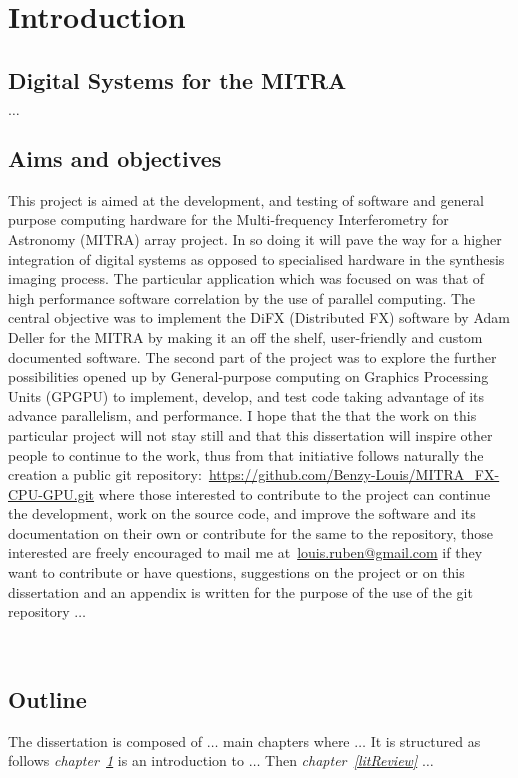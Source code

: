 
\chapter{Introduction} %

\label{Chapter1} %



\section{Digital Systems for the MITRA}
\label{sec:aboutDigiMITRA}
$\ldots$
\section{Aims and objectives}
\label{sec:aboutAimObjectives}
This project is aimed at the development, and testing of software and general purpose computing hardware for the Multi-frequency Interferometry for Astronomy (MITRA) array project. In so doing it will pave the way for a higher integration of digital systems as opposed to specialised hardware in the synthesis imaging process. The particular application which was focused on was that of high performance software correlation by the use of parallel computing. The central objective was to implement the DiFX (Distributed FX) software by Adam Deller for the MITRA by making it an off the shelf, user-friendly and custom documented software. The second part of the project was to explore the further possibilities opened up by General-purpose computing on Graphics Processing Units (GPGPU) to implement, develop, and test code taking advantage of its advance parallelism, and performance. I hope that the that the work on this particular project will not stay still and that this dissertation will inspire other people to continue to the work, thus from that initiative follows naturally the creation a public git repository:~\url{https://github.com/Benzy-Louis/MITRA_FX-CPU-GPU.git} where those interested to contribute to the project can continue the development, work on the source code, and improve the software and its documentation on their own or contribute for the same to the repository, those interested are freely encouraged to mail me at~\href{mailto:louis.ruben@gmail.com}{louis.ruben@gmail.com} if they want to contribute or have questions, suggestions on the project or on this dissertation and an appendix is written for the purpose of the use of the git repository $\ldots$

\
\section{Outline}
\label{sec:outline}
The dissertation is composed of $\ldots$ main chapters where $\ldots$ It is structured as follows \textit{chapter~\ref{Chapter1}} is an introduction to $\ldots$ Then \textit{chapter~\ref{litReview}} $\ldots$